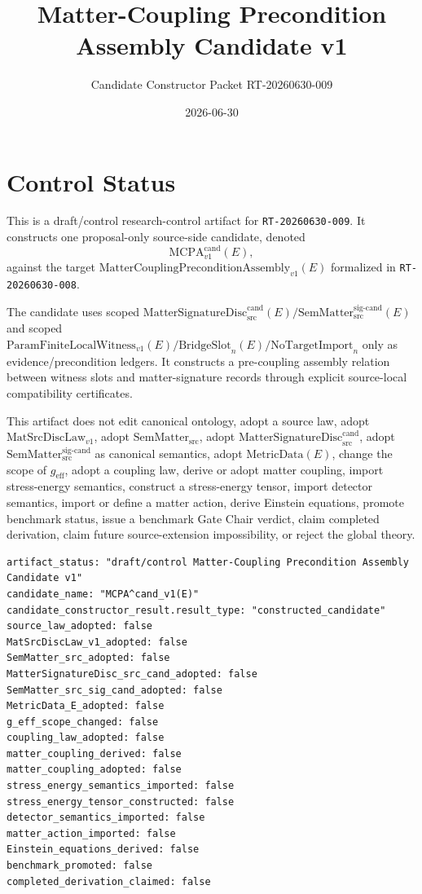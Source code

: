 \documentclass[11pt]{article}
\title{Matter-Coupling Precondition Assembly Candidate v1}
\author{Candidate Constructor Packet RT-20260630-009}
\date{2026-06-30}
\newcommand{\MetricData}{\mathrm{MetricData}}
\newcommand{\geff}{g_{\mathrm{eff}}}
\newcommand{\MatSrcDiscLaw}{\mathrm{MatSrcDiscLaw}_{v1}}
\newcommand{\SemMatterSrc}{\mathrm{SemMatter}_{\mathrm{src}}}
\newcommand{\SemMatterSig}{\mathrm{SemMatter}_{\mathrm{src}}^{\mathrm{sig\text{-}cand}}}
\newcommand{\MatSigDisc}{\mathrm{MatterSignatureDisc}_{\mathrm{src}}^{\mathrm{cand}}}
\newcommand{\ParamWitness}{\mathrm{ParamFiniteLocalWitness}_{v1}}
\newcommand{\BridgeSlot}{\mathrm{BridgeSlot}}
\newcommand{\NoTargetImport}{\mathrm{NoTargetImport}}
\newcommand{\MCPA}{\mathrm{MatterCouplingPreconditionAssembly}_{v1}}
\newcommand{\MCPACand}{\mathrm{MCPA}^{\mathrm{cand}}_{v1}}
\begin{document}
\maketitle

\section{Control Status}

This is a draft/control research-control artifact for
\texttt{RT-20260630-009}. It constructs one proposal-only source-side
candidate, denoted
\[
  \MCPACand(E),
\]
against the target \(\MCPA(E)\) formalized in
\texttt{RT-20260630-008}.

The candidate uses scoped \(\MatSigDisc(E) / \SemMatterSig(E)\) and scoped
\(\ParamWitness(E) / \BridgeSlot_n(E) / \NoTargetImport_n\) only as
evidence/precondition ledgers. It constructs a pre-coupling assembly relation
between witness slots and matter-signature records through explicit
source-local compatibility certificates.

This artifact does not edit canonical ontology, adopt a source law, adopt
\(\MatSrcDiscLaw\), adopt \(\SemMatterSrc\), adopt \(\MatSigDisc\), adopt
\(\SemMatterSig\) as canonical semantics, adopt \(\MetricData(E)\), change
the scope of \(\geff\), adopt a coupling law, derive or adopt matter
coupling, import stress-energy semantics, construct a stress-energy tensor,
import detector semantics, import or define a matter action, derive Einstein
equations, promote benchmark status, issue a benchmark Gate Chair verdict,
claim completed derivation, claim future source-extension impossibility, or
reject the global theory.

\begin{verbatim}
artifact_status: "draft/control Matter-Coupling Precondition Assembly Candidate v1"
candidate_name: "MCPA^cand_v1(E)"
candidate_constructor_result.result_type: "constructed_candidate"
source_law_adopted: false
MatSrcDiscLaw_v1_adopted: false
SemMatter_src_adopted: false
MatterSignatureDisc_src_cand_adopted: false
SemMatter_src_sig_cand_adopted: false
MetricData_E_adopted: false
g_eff_scope_changed: false
coupling_law_adopted: false
matter_coupling_derived: false
matter_coupling_adopted: false
stress_energy_semantics_imported: false
stress_energy_tensor_constructed: false
detector_semantics_imported: false
matter_action_imported: false
Einstein_equations_derived: false
benchmark_promoted: false
completed_derivation_claimed: false
\end{verbatim}
\end{document}

